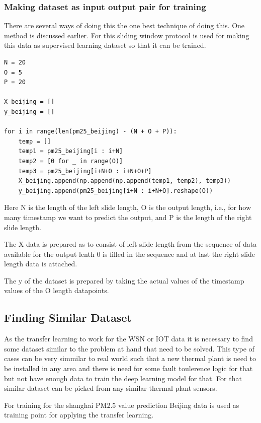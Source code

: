 \subsubsection{Making dataset as input output pair for training}

There are several ways of doing this the one best technique of doing this. One method is discussed earlier.
For this sliding window protocol is used for making this data as supervised learning dataset so that it can be trained.

\begin{verbatim}
N = 20
O = 5
P = 20

X_beijing = []
y_beijing = []

for i in range(len(pm25_beijing) - (N + O + P)):
    temp = []
    temp1 = pm25_beijing[i : i+N]
    temp2 = [0 for _ in range(O)]
    temp3 = pm25_beijing[i+N+O : i+N+O+P]
    X_beijing.append(np.append(np.append(temp1, temp2), temp3))
    y_beijing.append(pm25_beijing[i+N : i+N+O].reshape(O))
\end{verbatim}


Here N is the length of the left slide length, O is the output length, i.e., for how many timestamp we want to predict the output, and P is the length of the right slide length.

The X data is prepared as to consist of left slide length from the sequence of data available for the output lenth 0 is filled in the sequence and at last the right slide length data is attached.

The y of the dataset is prepared by taking the actual values of the timestamp values of the O length datapoints.


\subsection{Finding Similar Dataset}
As the transfer learning to work for the WSN or IOT data it is necessary to find some dataset similar to the problem at hand that need to be solved. This type of cases can be very simmilar to real world such that a new thermal plant is need to be installed in any area and there is need for some fault toulerence logic for that but not have enough data to train the deep learning model for that. For that similar dataset can be picked from any similar thermal plant sensors.

For training for the shanghai PM2.5 value prediction Beijing data is used as training point for applying the transfer learning.

